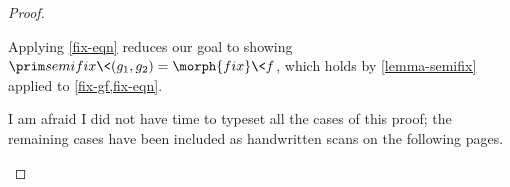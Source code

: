 \begin{proof}
\begin{description}[topsep=\baselineskip,itemsep=\baselineskip]
    Applying \cref{fix-eqn} reduces our goal to showing $\semifix\<(g_1, g_2)
    = \morph{fix}\<f$, which holds by \cref{lemma-semifix} applied to \cref{fix-gf,fix-eqn}.

  \item[Remaining cases.] I am afraid I did not have time to typeset all the cases of this proof; the remaining cases have been included as handwritten scans on the following pages.
    
  \end{description}

  
\end{proof}
